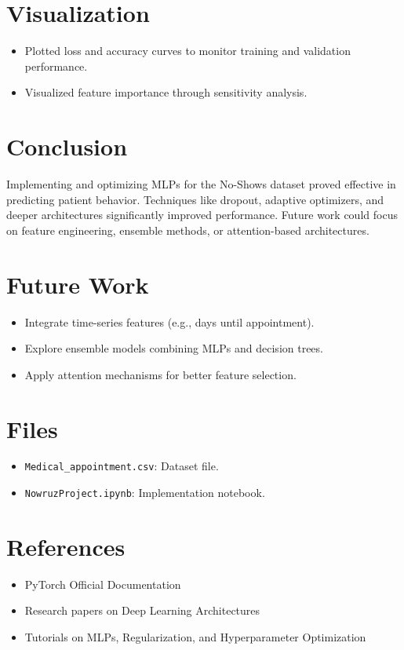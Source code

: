 \documentclass[12pt]{article}
\begin{document}
\section{Visualization}
\begin{itemize}
    \item Plotted loss and accuracy curves to monitor training and validation performance.
    \item Visualized feature importance through sensitivity analysis.
\end{itemize}

\section{Conclusion}
Implementing and optimizing MLPs for the No-Shows dataset proved effective in predicting patient behavior. Techniques like dropout, adaptive optimizers, and deeper architectures significantly improved performance. Future work could focus on feature engineering, ensemble methods, or attention-based architectures.

\section{Future Work}
\begin{itemize}
    \item Integrate time-series features (e.g., days until appointment).
    \item Explore ensemble models combining MLPs and decision trees.
    \item Apply attention mechanisms for better feature selection.
\end{itemize}

\section{Files}
\begin{itemize}
    \item \texttt{Medical\_appointment.csv}: Dataset file.
    \item \texttt{NowruzProject.ipynb}: Implementation notebook.
\end{itemize}

\section{References}
\begin{itemize}
    \item PyTorch Official Documentation
    \item Research papers on Deep Learning Architectures
    \item Tutorials on MLPs, Regularization, and Hyperparameter Optimization
\end{itemize}
\end{document}
